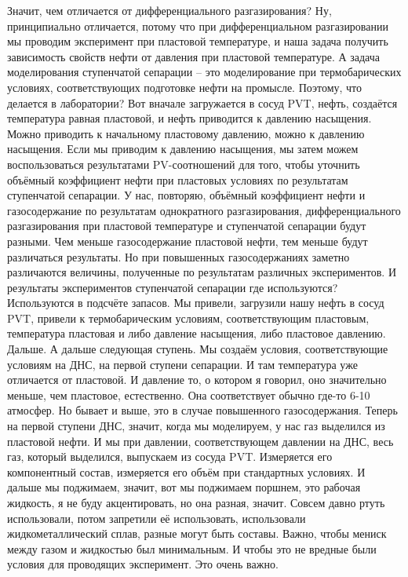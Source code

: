 \documentclass[main.tex]{subfiles}
\begin{document}
Значит, чем отличается от дифференциального разгазирования?
Ну, принципиально отличается, потому что при дифференциальном разгазировании мы проводим эксперимент при пластовой температуре, и наша задача получить зависимость свойств нефти от давления при пластовой температуре.
А задача моделирования ступенчатой сепарации -- это моделирование при термобарических условиях, соответствующих подготовке нефти на промысле.
Поэтому, что делается в лаборатории?
Вот вначале загружается в сосуд PVT, нефть, создаётся температура равная пластовой, и нефть приводится к давлению насыщения.
Можно приводить к начальному пластовому давлению, можно к давлению насыщения.
Если мы приводим к давлению насыщения, мы затем можем воспользоваться результатами PV-соотношений для того, чтобы уточнить объёмный коэффициент нефти при пластовых условиях по результатам ступенчатой сепарации.
У нас, повторяю, объёмный коэффициент нефти и газосодержание по результатам однократного разгазирования, дифференциального разгазирования при пластовой температуре и ступенчатой сепарации будут разными.
Чем меньше газосодержание пластовой нефти, тем меньше будут различаться результаты.
Но при повышенных газосодержаниях заметно различаются величины, полученные по результатам различных экспериментов.
И результаты экспериментов ступенчатой сепарации где используются?
Используются в подсчёте запасов.
Мы привели, загрузили нашу нефть в сосуд PVT, привели к термобарическим условиям, соответствующим пластовым, температура пластовая и либо давление насыщения, либо пластовое давлению.
Дальше.
А дальше следующая ступень.
Мы создаём условия, соответствующие условиям на ДНС, на первой ступени сепарации.
И там температура уже отличается от пластовой.
И давление то, о котором я говорил, оно значительно меньше, чем пластовое, естественно.
Она соответствует обычно где-то 6-10 атмосфер.
Но бывает и выше, это в случае повышенного газосодержания.
Теперь на первой ступени ДНС, значит, когда мы моделируем, у нас газ выделился из пластовой нефти.
И мы при давлении, соответствующем давлении на ДНС, весь газ, который выделился, выпускаем из сосуда PVT.
Измеряется его компонентный состав, измеряется его объём при стандартных условиях.
И дальше мы поджимаем, значит, вот мы поджимаем поршнем, это рабочая жидкость, я не буду акцентировать, но она разная, значит.
Совсем давно ртуть использовали, потом запретили её использовать, использовали жидкометаллический сплав, разные могут быть составы.
Важно, чтобы мениск между газом и жидкостью был минимальным.
И чтобы это не вредные были условия для проводящих эксперимент.
Это очень важно.
\end{document}
